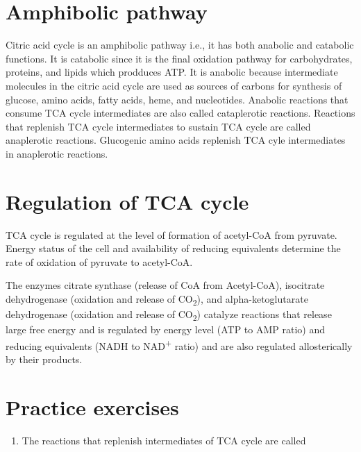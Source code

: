 \documentclass[
]{book}
\providecommand{\tightlist}{%
  \setlength{\itemsep}{0pt}\setlength{\parskip}{0pt}}
\begin{document}
\section{Amphibolic pathway}\label{amphibolic-pathway}

Citric acid cycle is an amphibolic pathway i.e., it has both anabolic and catabolic functions. It is catabolic since it is the final oxidation pathway for carbohydrates, proteins, and lipids which prodduces ATP. It is anabolic because intermediate molecules in the citric acid cycle are used as sources of carbons for synthesis of glucose, amino acids, fatty acids, heme, and nucleotides. Anabolic reactions that consume TCA cycle intermediates are also called cataplerotic reactions. Reactions that replenish TCA cycle intermediates to sustain TCA cycle are called anaplerotic reactions. Glucogenic amino acids replenish TCA cyle intermediates in anaplerotic reactions.

\section{Regulation of TCA cycle}\label{regulation-of-tca-cycle}

TCA cycle is regulated at the level of formation of acetyl-CoA from pyruvate. Energy status of the cell and availability of reducing equivalents determine the rate of oxidation of pyruvate to acetyl-CoA.

The enzymes citrate synthase (release of CoA from Acetyl-CoA), isocitrate dehydrogenase (oxidation and release of CO\textsubscript{2}), and alpha-ketoglutarate dehydrogenase (oxidation and release of CO\textsubscript{2}) catalyze reactions that release large free energy and is regulated by energy level (ATP to AMP ratio) and reducing equivalents (NADH to NAD\textsuperscript{+} ratio) and are also regulated allosterically by their products.

\section{Practice exercises}\label{practice-exercises-2}

\begin{enumerate}
\def\labelenumi{\arabic{enumi}.}
\tightlist
\item
  The reactions that replenish intermediates of TCA cycle are called
\end{enumerate}
\end{document}
